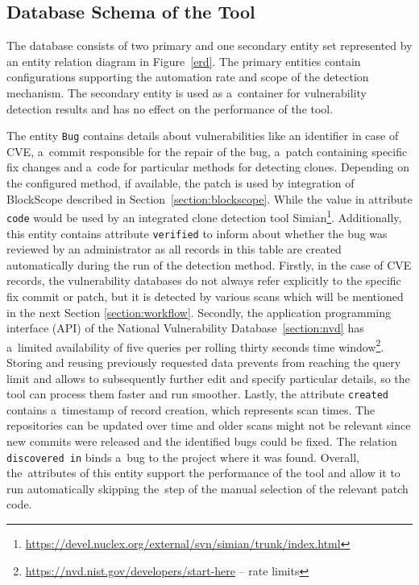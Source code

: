     \subsection*{Database Schema of the Tool}
    \label{design:database}
    The database consists of two primary and one secondary entity set represented by an entity relation diagram
    in Figure~\ref{erd}. The primary entities contain configurations supporting the automation rate and scope
    of the detection mechanism. The secondary entity is used as a~container for vulnerability detection
    results and has no effect on the performance of the tool.

    The entity \texttt{Bug} contains details about vulnerabilities like an identifier in case of CVE, a~commit
    responsible for the repair of the bug, a~patch containing specific fix changes and a~code for particular
    methods for detecting clones. Depending on the configured method, if available, the patch is used
    by integration of BlockScope described in Section~\ref{section:blockscope}. While the value in attribute \texttt{code}
    would be used by an integrated clone detection tool Simian\footnote{\href{https://devel.nuclex.org/external/svn/simian/trunk/index.html}
    {https://devel.nuclex.org/external/svn/simian/trunk/index.html}}.
    Additionally, this entity contains attribute \texttt{verified} to inform about whether the bug was reviewed
    by an administrator as all records in this table are created automatically during the run of the detection
    method. Firstly, in the case of CVE records, the vulnerability databases do not always refer explicitly
    to the specific fix commit or patch, but it is detected by various scans which will be mentioned in the next
    Section \ref{section:workflow}. Secondly, the application programming interface (API) of the National Vulnerability
    Database~\ref{section:nvd} has a~limited availability of five queries per rolling thirty seconds time window\footnote{
    \href{https://nvd.nist.gov/developers/start-here}{https://nvd.nist.gov/developers/start-here} -- rate limits}.
    Storing and reusing previously requested data prevents from reaching the query limit and allows to subsequently
    further edit and specify particular details, so the tool can process them faster and run smoother.
    Lastly, the attribute \texttt{created} contains a~timestamp of record creation, which represents scan times.
    The repositories can be updated over time and older scans might not be relevant since new commits were released
    and the identified bugs could be fixed. The relation \texttt{discovered in} binds a~bug to the project where it was found.
    Overall, the~attributes of this entity support the performance of the tool and allow it to run automatically
    skipping the~step of the manual selection of the relevant patch code.

